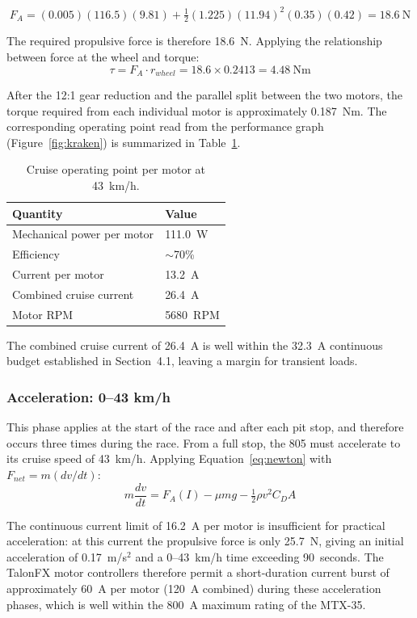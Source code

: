 \documentclass[12pt]{article}
\begin{document}
\[
F_A = (0.005)(116.5)(9.81) + \tfrac{1}{2}(1.225)(11.94)^2(0.35)(0.42)
    = 18.6~\text{N}
\]

The required propulsive force is therefore 18.6~N. Applying the
relationship between force at the wheel and torque:
\[
\tau = F_A \cdot r_{wheel} = 18.6 \times 0.2413 = 4.48~\text{Nm}
\]

After the 12:1 gear reduction and the parallel split between the two
motors, the torque required from each individual motor is approximately
0.187~Nm. The corresponding operating point read from the performance graph
(Figure~\ref{fig:kraken}) is summarized in Table~\ref{tab:cruisepoint}.

\begin{table}[htbp]
  \centering
  \caption{Cruise operating point per motor at 43~km/h.}
  \label{tab:cruisepoint}
  \begin{tabular}{ll}
    \toprule
    \textbf{Quantity} & \textbf{Value} \\
    \midrule
    Mechanical power per motor   & 111.0~W \\
    Efficiency                   & $\sim$70\% \\
    Current per motor            & 13.2~A \\
    Combined cruise current      & 26.4~A \\
    Motor RPM                    & 5680~RPM \\
    \bottomrule
  \end{tabular}
\end{table}

The combined cruise current of 26.4~A is well within the 32.3~A continuous
budget established in Section~4.1, leaving a margin for transient loads.

\subsubsection{Acceleration: 0--43 km/h}

This phase applies at the start of the race and after each pit stop, and
therefore occurs three times during the race. From a full stop, the 805
must accelerate to its cruise speed of 43~km/h. Applying
Equation~\ref{eq:newton} with $F_{net} = m(dv/dt)$:
\[
m \frac{dv}{dt} = F_A(I) - \mu mg - \tfrac{1}{2}\rho v^2 C_D A
\]

The continuous current limit of 16.2~A per motor is insufficient for
practical acceleration: at this current the propulsive force is only
25.7~N, giving an initial acceleration of 0.17~m/s$^2$ and a 0--43~km/h
time exceeding 90~seconds. The TalonFX motor controllers therefore permit
a short-duration current burst of approximately 60~A per motor (120~A
combined) during these acceleration phases, which is well within the
800~A maximum rating of the MTX-35.
\end{document}

